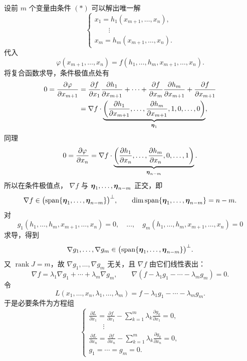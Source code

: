 设前 $m$ 个变量由条件 $(*)$ 可以解出唯一解
\[
\begin{cases}
x_1=h_1(x_{m+1},\ldots,x_n),\\
\qquad\vdots\\
x_m=h_m(x_{m+1},\ldots,x_n).
\end{cases}
\]
代入
\[
\varphi(x_{m+1},\ldots,x_n)
=f(h_1,\ldots,h_m,x_{m+1},\ldots,x_n).
\]
将复合函数求导，条件极值点处有
\[
\begin{aligned}
0=\frac{\partial\varphi}{\partial x_{m+1}}
&=\frac{\partial f}{\partial x_1}
\frac{\partial h_1}{\partial x_{m+1}}
+\cdots+
\frac{\partial f}{\partial x_m}
\frac{\partial h_m}{\partial x_{m+1}}
+\frac{\partial f}{\partial x_{m+1}}\\
&=\nabla f\cdot
\underbrace{\left(
\frac{\partial h_1}{\partial x_{m+1}},
\ldots,
\frac{\partial h_m}{\partial x_{m+1}},
1,0,\ldots,0
\right)}_{\boldsymbol{\eta}_1},
\end{aligned}
\]
同理
\[
0=\frac{\partial\varphi}{\partial x_n}
=\nabla f\cdot
\underbrace{\left(
\frac{\partial h_1}{\partial x_n},
\ldots,
\frac{\partial h_m}{\partial x_n},
0,\ldots,1
\right)}_{\boldsymbol{\eta}_{n-m}}.
\]
所以在条件极值点，
$\nabla f$ 与 $\boldsymbol{\eta}_1,\ldots,\boldsymbol{\eta}_{n-m}$ 正交，即
\[
\nabla f\in
\bigl(\operatorname{span}\{\boldsymbol{\eta}_1,\ldots,\boldsymbol{\eta}_{n-m}\}\bigr)^\perp,
\qquad
\dim\operatorname{span}\{\boldsymbol{\eta}_1,\ldots,\boldsymbol{\eta}_{n-m}\}=n-m.
\]
对
\[
g_1(h_1,\ldots,h_m,x_{m+1},\ldots,x_n)=0,\quad
\ldots,\quad
g_m(h_1,\ldots,h_m,x_{m+1},\ldots,x_n)=0
\]
求导，得到
\[
\nabla g_1,\ldots,\nabla g_m
\in
\bigl(\operatorname{span}\{\boldsymbol{\eta}_1,\ldots,\boldsymbol{\eta}_{n-m}\}\bigr)^\perp.
\]
又 $\operatorname{rank}J=m$，故
$\nabla g_1,\ldots,\nabla g_m$ 无关，且
$\nabla f$ 由它们线性表出：
\[
\nabla f=\lambda_1\nabla g_1+\cdots+\lambda_m\nabla g_m,
\qquad
\nabla(f-\lambda_1g_1-\cdots-\lambda_mg_m)=0.
\]
令
\[
L(x_1,\ldots,x_n,\lambda_1,\ldots,\lambda_m)
=f-\lambda_1g_1-\cdots-\lambda_mg_m.
\]
于是必要条件为方程组
\[
\begin{cases}
\displaystyle\frac{\partial L}{\partial x_1}
=\frac{\partial f}{\partial x_1}
-\sum_{k=1}^m\lambda_k\frac{\partial g_k}{\partial x_1}=0,\\
\qquad\vdots\\
\displaystyle\frac{\partial L}{\partial x_n}
=\frac{\partial f}{\partial x_n}
-\sum_{k=1}^m\lambda_k\frac{\partial g_k}{\partial x_n}=0,\\
g_1=\cdots=g_m=0.
\end{cases}\tag{*}
\]



